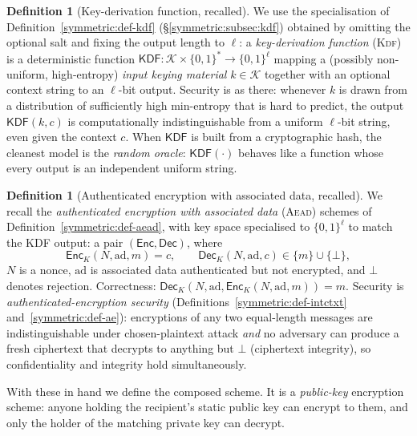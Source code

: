\documentclass[11pt,a4paper]{article}
\theoremstyle{definition}
\newtheorem{definition}[theorem]{Definition}
\theoremstyle{remark}
\begin{document}
\begin{definition}[Key-derivation function, recalled]\label{keyagreement:def:kdf}
We use the specialisation of Definition~\ref{symmetric:def-kdf} (\S\ref{symmetric:subsec:kdf}) obtained by omitting the optional salt and fixing the output length to \(\ell\): a \emph{key-derivation function} (\textsc{Kdf}) is a deterministic function \(\mathsf{KDF}\colon \mathcal{K} \times \{0,1\}^* \to \{0,1\}^\ell\) mapping a (possibly non-uniform, high-entropy) \emph{input keying material} \(k \in \mathcal{K}\) together with an optional context string to an \(\ell\)-bit output. Security is as there: whenever \(k\) is drawn from a distribution of sufficiently high min-entropy that is hard to predict, the output \(\mathsf{KDF}(k, c)\) is computationally indistinguishable from a uniform \(\ell\)-bit string, even given the context \(c\). When \(\mathsf{KDF}\) is built from a cryptographic hash, the cleanest model is the \emph{random oracle}: \(\mathsf{KDF}(\cdot)\) behaves like a function whose every output is an independent uniform string.
\end{definition}

\begin{definition}[Authenticated encryption with associated data, recalled]\label{keyagreement:def:aead}
We recall the \emph{authenticated encryption with associated data} (\textsc{Aead}) schemes of Definition~\ref{symmetric:def-aead}, with key space specialised to \(\{0,1\}^\ell\) to match the KDF output: a pair \((\mathsf{Enc}, \mathsf{Dec})\), where
\[
  \mathsf{Enc}_K(N, \mathrm{ad}, m) = c, \qquad \mathsf{Dec}_K(N, \mathrm{ad}, c) \in \{m\} \cup \{\bot\},
\]
\(N\) is a nonce, \(\mathrm{ad}\) is associated data authenticated but not encrypted, and \(\bot\) denotes rejection. Correctness: \(\mathsf{Dec}_K(N, \mathrm{ad}, \mathsf{Enc}_K(N, \mathrm{ad}, m)) = m\). Security is \emph{authenticated-encryption security} (Definitions~\ref{symmetric:def-intctxt} and~\ref{symmetric:def-ae}): encryptions of any two equal-length messages are indistinguishable under chosen-plaintext attack \emph{and} no adversary can produce a fresh ciphertext that decrypts to anything but \(\bot\) (ciphertext integrity), so confidentiality and integrity hold simultaneously.
\end{definition}

With these in hand we define the composed scheme. It is a \emph{public-key} encryption scheme: anyone holding the recipient's static public key can encrypt to them, and only the holder of the matching private key can decrypt.
\end{document}
